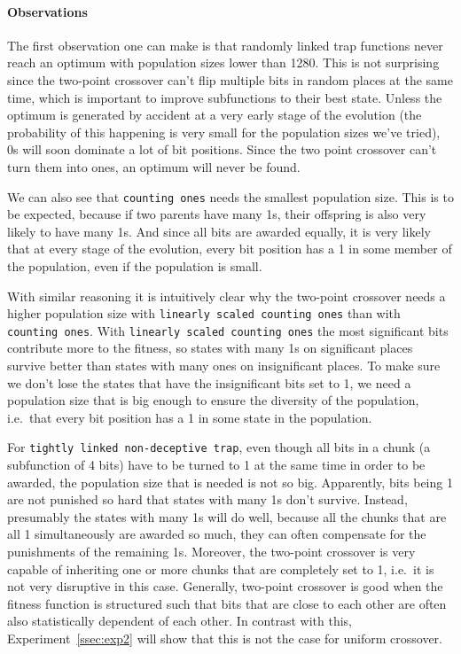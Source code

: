 \documentclass[12pt]{article}
\theoremstyle{definition}
\newcommand{\co}{\texttt{counting ones}}
\newcommand{\lsco}{\texttt{linearly scaled counting ones}}
\newcommand{\tnt}{\texttt{tightly linked non-deceptive trap}}
\begin{document}
\paragraph{Observations}
The first observation one can make is that randomly linked trap functions never reach an optimum with population sizes lower than 1280.
This is not surprising since the two-point crossover can't flip multiple bits
in random places at the same time, which is important to improve subfunctions to their best state.
Unless the optimum is generated by accident at a very early stage of the evolution
(the probability of this happening is very small for the population sizes we've tried),
0s will soon dominate a lot of bit positions.
Since the two point crossover can't turn them into ones, an optimum will never be found.


We can also see that \co{} needs the smallest population size.
This is to be expected, because if two parents have many 1s,
their offspring is also very likely to have many 1s.
And since all bits are awarded equally, it is very likely that at every stage of the evolution,
every bit position has a 1 in some member of the population, even if the population is small.

With similar reasoning it is intuitively clear why the two-point crossover needs a
higher population size with \lsco{} than with \co{}.
With \lsco{} the most significant bits contribute more to the fitness, so states with many 1s
on significant places survive better than states with many ones on insignificant places.
To make sure we don't lose the states that have the insignificant bits set to 1, we need
a population size that is big enough to ensure the diversity of the population,
i.e.\ that every bit position has a 1 in some state in the population.

For \tnt{}, even though all bits in a chunk (a subfunction of 4 bits) have to be turned to 1
at the same time in order to be awarded, the population size that is needed is not so big.
Apparently, bits being 1 are not punished so hard that states with many 1s don't survive.
Instead, presumably the states with many 1s will do well, because all the chunks that
are all 1 simultaneously are awarded so much, they can often compensate for the punishments of
the remaining 1s.
Moreover, the two-point crossover is very capable of inheriting one or more chunks that are
completely set to 1, i.e.\ it is not very disruptive in this case.
Generally, two-point crossover is good when the fitness function is structured such that
bits that are close to each other are often also statistically dependent of each other.
In contrast with this, Experiment~\ref{ssec:exp2} will show that this is not the case for
uniform crossover.
\end{document}
